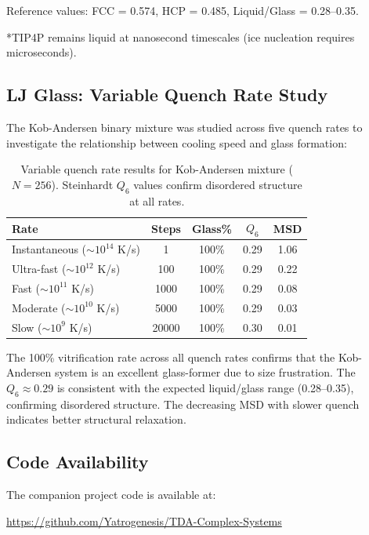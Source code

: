 \documentclass[11pt]{article}
\begin{document}
Reference values: FCC = 0.574, HCP = 0.485, Liquid/Glass = 0.28--0.35.

*TIP4P remains liquid at nanosecond timescales (ice nucleation requires microseconds).

\subsection{LJ Glass: Variable Quench Rate Study}

The Kob-Andersen binary mixture was studied across five quench rates to investigate the relationship between cooling speed and glass formation:

\begin{table}[h]
\centering
\caption{Variable quench rate results for Kob-Andersen mixture ($N=256$). Steinhardt $Q_6$ values confirm disordered structure at all rates.}
\label{tab:quench}
\begin{tabular}{lcccc}
\toprule
\textbf{Rate} & \textbf{Steps} & \textbf{Glass\%} & \textbf{$Q_6$} & \textbf{MSD} \\
\midrule
Instantaneous ($\sim10^{14}$ K/s) & 1 & 100\% & 0.29 & 1.06 \\
Ultra-fast ($\sim10^{12}$ K/s) & 100 & 100\% & 0.29 & 0.22 \\
Fast ($\sim10^{11}$ K/s) & 1000 & 100\% & 0.29 & 0.08 \\
Moderate ($\sim10^{10}$ K/s) & 5000 & 100\% & 0.29 & 0.03 \\
Slow ($\sim10^{9}$ K/s) & 20000 & 100\% & 0.30 & 0.01 \\
\bottomrule
\end{tabular}
\end{table}

The 100\% vitrification rate across all quench rates confirms that the Kob-Andersen system is an excellent glass-former due to size frustration. The $Q_6 \approx 0.29$ is consistent with the expected liquid/glass range (0.28--0.35), confirming disordered structure. The decreasing MSD with slower quench indicates better structural relaxation.

\subsection{Code Availability}

The companion project code is available at:

\begin{center}
\url{https://github.com/Yatrogenesis/TDA-Complex-Systems}
\end{center}
\end{document}
